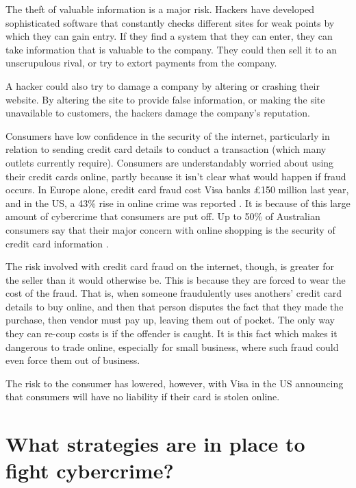 \documentclass[11pt,a4paper,twoside,notitlepage]{article}
\begin{document}
 The theft of valuable information is a major risk.  Hackers have developed sophisticated 
 software that constantly checks different sites for weak points by which they can
 gain entry.  If they find a system that they can enter, they can take information
 that is valuable to the company.  They could then sell it to an unscrupulous rival,
 or try to extort payments from the company.

 A hacker could also try to damage a company by altering or crashing their website.
 By altering the site to provide false information, or making the site unavailable to
 customers, the hackers damage the company's reputation.

 Consumers have low confidence in the security of the internet, particularly in relation
 to sending credit card details to conduct a transaction (which many outlets currently
 require).  Consumers are understandably worried about using their credit cards online,
 partly because it isn't clear what would happen if fraud occurs\cite{Sinclair:Age00}.
 In Europe alone, credit card fraud cost Visa banks \pounds 150 million last
 year, and in the US, a 43\% rise in online crime was reported \cite{August:Comp00}.
 It is because of this large amount of cybercrime that consumers are put off.
 Up to 50\% of Australian consumers say that their major concern with online shopping
 is the security of credit card information \cite{anon:ABF00}.  
 
 The risk involved with credit card fraud on the internet, though, is greater for
 the seller than it would otherwise be.  This is because they are forced to wear
 the cost of the fraud.  That is, when someone fraudulently uses anothers' 
 credit card details to buy online, and then that person disputes the fact that
 they made the purchase, then vendor must pay up, leaving them out of pocket.  
 The only way they can re-coup costs is if the offender is caught.  It is this fact
 which makes it dangerous to trade online, especially for small business, where 
 such fraud could even force them out of business.

 The risk to the consumer has lowered, however, with Visa in the US announcing that
 consumers will have no liability if their card is stolen online\cite{Sinclair:Age00}.
  


\section*{What strategies are in place to fight cybercrime?}
\end{document}
